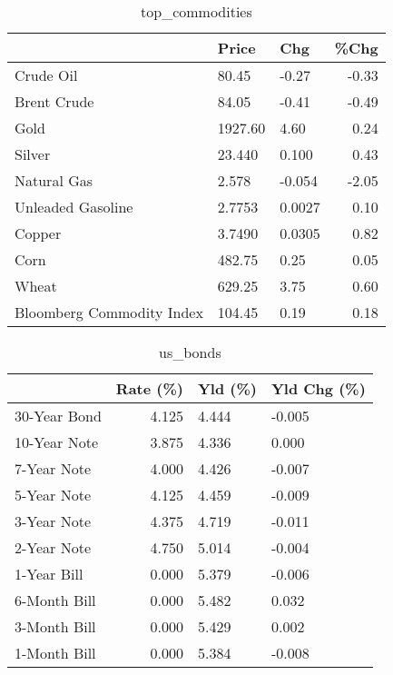 \documentclass{article}%
\begin{document}
\begin{table}[htbp]%
\caption{top\_commodities}%
\centering%
\begin{adjustbox}{width=1\textwidth}%
\begin{tabular}{lllr}
\toprule
                          &   Price &    Chg &  \%Chg \\
\midrule
               Crude Oil  &   80.45 &  -0.27 & -0.33 \\
             Brent Crude  &   84.05 &  -0.41 & -0.49 \\
                    Gold  & 1927.60 &   4.60 &  0.24 \\
                  Silver  &  23.440 &  0.100 &  0.43 \\
             Natural Gas  &   2.578 & -0.054 & -2.05 \\
       Unleaded Gasoline  &  2.7753 & 0.0027 &  0.10 \\
                  Copper  &  3.7490 & 0.0305 &  0.82 \\
                    Corn  &  482.75 &   0.25 &  0.05 \\
                   Wheat  &  629.25 &   3.75 &  0.60 \\
Bloomberg Commodity Index &  104.45 &   0.19 &  0.18 \\
\bottomrule
\end{tabular}
%
\end{adjustbox}%
\end{table}

%


\begin{table}[htbp]%
\caption{us\_bonds}%
\centering%
\begin{adjustbox}{width=1\textwidth}%
\begin{tabular}{lrll}
\toprule
             &  Rate (\%) & Yld (\%) & Yld Chg (\%) \\
\midrule
30-Year Bond &     4.125 &   4.444 &      -0.005 \\
10-Year Note &     3.875 &   4.336 &       0.000 \\
 7-Year Note &     4.000 &   4.426 &      -0.007 \\
 5-Year Note &     4.125 &   4.459 &      -0.009 \\
 3-Year Note &     4.375 &   4.719 &      -0.011 \\
 2-Year Note &     4.750 &   5.014 &      -0.004 \\
 1-Year Bill &     0.000 &   5.379 &      -0.006 \\
6-Month Bill &     0.000 &   5.482 &       0.032 \\
3-Month Bill &     0.000 &   5.429 &       0.002 \\
1-Month Bill &     0.000 &   5.384 &      -0.008 \\
\bottomrule
\end{tabular}
%
\end{adjustbox}%
\end{table}
\end{document}
